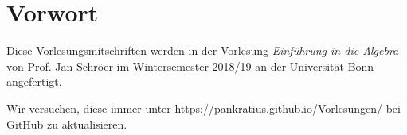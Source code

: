 \chapter*{Vorwort}
Diese Vorlesungsmitschriften werden in der Vorlesung \textit{Einführung in die Algebra} von Prof. Jan Schröer im Wintersemester 2018/19 an der Universität Bonn angefertigt.\par
Wir versuchen, diese immer unter \url{https://pankratius.github.io/Vorlesungen/} bei GitHub zu aktualisieren.